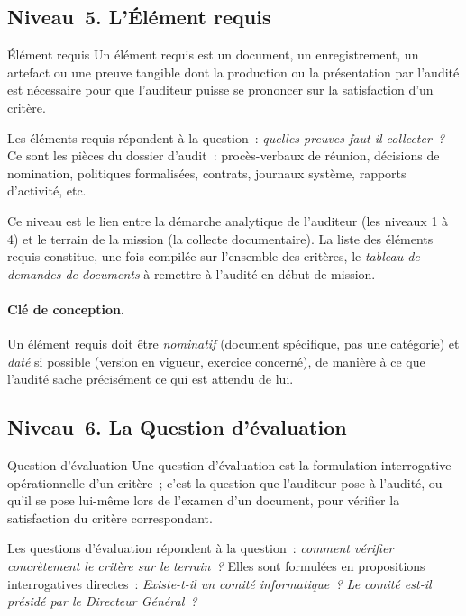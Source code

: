 \subsection{Niveau~5. L'Élément requis}

\begin{boxdef}{Élément requis}
Un élément requis est un document, un enregistrement, un artefact ou une
preuve tangible dont la production ou la présentation par l'audité est nécessaire
pour que l'auditeur puisse se prononcer sur la satisfaction d'un critère.
\end{boxdef}

Les éléments requis répondent à la question~: \emph{quelles preuves faut-il
collecter~?} Ce sont les pièces du dossier d'audit~: procès-verbaux de réunion,
décisions de nomination, politiques formalisées, contrats, journaux système,
rapports d'activité, etc.

Ce niveau est le lien entre la démarche analytique de l'auditeur (les niveaux 1
à 4) et le terrain de la mission (la collecte documentaire). La liste des
éléments requis constitue, une fois compilée sur l'ensemble des critères, le
\emph{tableau de demandes de documents} à remettre à l'audité en début de
mission.

\paragraph{Clé de conception.}
Un élément requis doit être \emph{nominatif} (document spécifique, pas une
catégorie) et \emph{daté} si possible (version en vigueur, exercice concerné),
de manière à ce que l'audité sache précisément ce qui est attendu de lui.

\subsection{Niveau~6. La Question d'évaluation}

\begin{boxdef}{Question d'évaluation}
Une question d'évaluation est la formulation interrogative opérationnelle d'un
critère~; c'est la question que l'auditeur pose à l'audité, ou qu'il se pose
lui-même lors de l'examen d'un document, pour vérifier la satisfaction du
critère correspondant.
\end{boxdef}

Les questions d'évaluation répondent à la question~: \emph{comment vérifier
concrètement le critère sur le terrain~?} Elles sont formulées en propositions
interrogatives directes~: \emph{Existe-t-il un comité informatique~? Le comité
est-il présidé par le Directeur Général~?}

